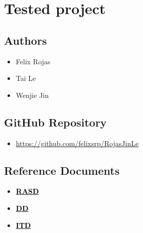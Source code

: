 \chapter{Tested project}

\section*{Authors}
\begin{itemize}
    \item Felix Rojas
    \item Tai Le
    \item Wenjie Jin
\end{itemize}

\section*{GitHub Repository}
\begin{itemize}
    \item \url{https://github.com/felixsrp/RojasJinLe}
\end{itemize}

\section*{Reference Documents}
\begin{itemize}
    \item \href{https://github.com/felixsrp/RojasJinLe/blob/main/DeliveryFolder/RASDv4.pdf}{\textcolor{black}{\textbf{RASD}}}
    \item \href{https://github.com/felixsrp/RojasJinLe/blob/main/DeliveryFolder/DDv3.pdf}{\textcolor{black}{\textbf{DD}}}
    \item \href{https://github.com/felixsrp/RojasJinLe/blob/main/DeliveryFolder/ITDv1.pdf}{\textcolor{black}{\textbf{ITD}}}
\end{itemize}
